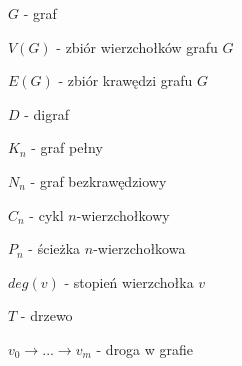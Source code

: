 $G$ - graf

$V(G)$ - zbiór wierzchołków grafu $G$

$E(G)$ - zbiór krawędzi grafu $G$

$D$ - digraf

$K_n$ - graf pełny

$N_n$ - graf bezkrawędziowy

$C_n$ - cykl $n$-wierzchołkowy

$P_n$ - ścieżka $n$-wierzchołkowa

$deg(v)$ - stopień wierzchołka $v$

$T$ - drzewo

$v_0 \rightarrow ... \rightarrow v_m$ - droga w grafie

